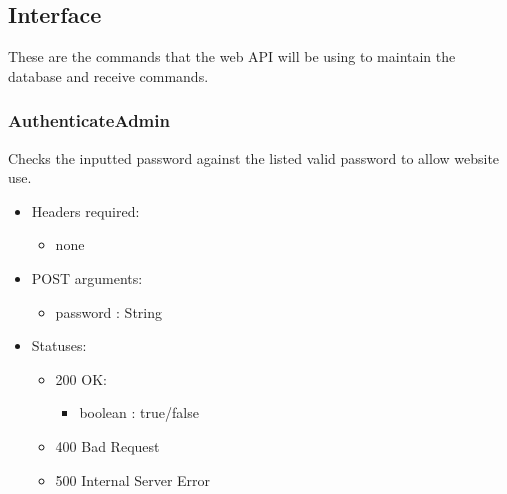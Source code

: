 \subsection{Interface}
    These are the commands that the web API will be using to maintain the database and receive commands.

    \subsubsection{AuthenticateAdmin}
        Checks the inputted password against the listed valid password to allow website use.
        \begin{itemize}
            \item Headers required:
            \begin{itemize}
                \item none
             \end{itemize}
            \item POST arguments:
            \begin{itemize}
                \item password : String
             \end{itemize}
             \item Statuses:
            \begin{itemize}
                \item 200 OK:
                \begin{itemize}
                    \item boolean : true/false
                \end{itemize}
                \item 400 Bad Request
                \item 500 Internal Server Error
            \end{itemize}
       \end{itemize}


